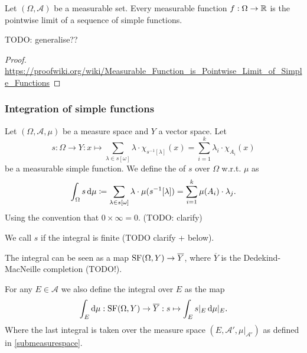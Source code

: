 \begin{proposition}
Let $(\Omega,\mathcal{A})$ be a measurable set. Every measurable function $f:\Omega\to \mathbb{R}$ is the pointwise limit of a sequence of simple functions.
\end{proposition}
TODO: generalise??
\begin{proof}
\url{https://proofwiki.org/wiki/Measurable_Function_is_Pointwise_Limit_of_Simple_Functions}
\end{proof}

\subsubsection{Integration of simple functions}
\begin{definition}
Let $(\Omega, \mathcal{A}, \mu)$ be a measure space and $Y$ a vector space. Let
\[ s:\Omega \to Y: x\mapsto \sum_{\lambda \in s[\omega]}\lambda\cdot \chi_{s^{-1}[\lambda]}(x) = \sum_{i=1}^k\lambda_i\cdot\chi_{A_i}(x)  \]
be a measurable simple function. We define the  of $s$ over $\Omega$ w.r.t. $\mu$ as
\[ \int_\Omega s\operatorname{d \!}{\mu} \coloneqq \sum_{\lambda \in s[\omega]}\lambda\cdot \mu(s^{-1}[\lambda]) = \sum_{i=1}^k\mu(A_i)\cdot\lambda_j. \]
Using the convention that $0\times \infty = 0$. (TODO: clarify)

We call $s$  if the integral is finite (TODO clarify + below).
\end{definition}

The integral can be seen as a map $\operatorname{SF}(\Omega,Y)\to \overline{Y}$, where $\overline{Y}$ is the Dedekind-MacNeille completion (TODO!).

For any $E\in\mathcal{A}$ we also define the integral over $E$ as the map
\[ \int_E\operatorname{d \!}{\mu}: \operatorname{SF}(\Omega,Y) \to \overline{Y}: s\mapsto \int_E s|_E \operatorname{d \!}{\mu|_E}. \]
Where the last integral is taken over the measure space $(E,\mathcal{A}',\mu|_{\mathcal{A}'})$ as defined in \ref{submeasurespace}.

